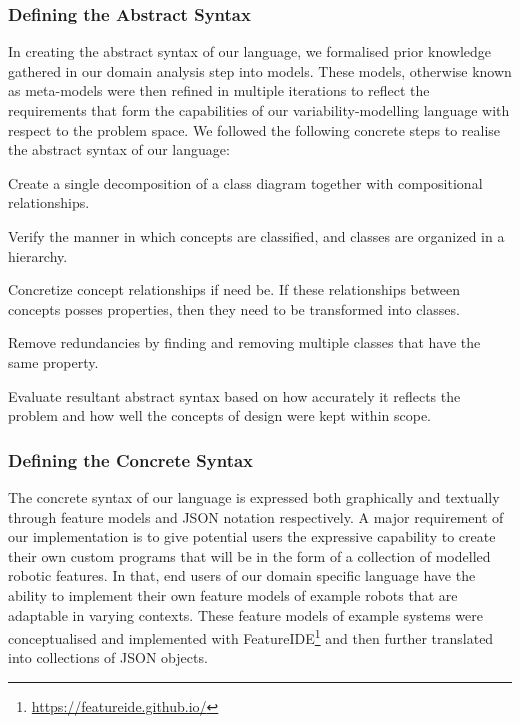 \documentclass[conference]{IEEEtran}
\newcommand{\foot}[1]{\footnote{\url{#1}}}
\begin{document}
\subsubsection{Defining the Abstract Syntax}
In creating the abstract syntax of our language, we formalised prior knowledge gathered in our domain analysis step into models. These models, otherwise known as meta-models were then refined in multiple iterations to reflect the requirements that form the capabilities of our variability-modelling language with respect to the problem space. We followed the following concrete steps to realise the abstract syntax of our language: \begin{enumerate*}[label=(\roman*)]
    \item Create a single decomposition of a class diagram together with compositional relationships.
    \item Verify the manner in which concepts are classified, and classes are organized in a hierarchy.
    \item Concretize concept relationships if need be. If these relationships between concepts posses properties, then they need to be transformed into classes.
    \item Remove redundancies by finding and removing multiple classes that have the same property.
    \item Evaluate resultant abstract syntax based on how accurately it reflects the problem and how well the concepts of design were kept within scope.
\end{enumerate*}

\subsubsection{Defining the Concrete Syntax}
The concrete syntax of our language is expressed both graphically and textually through feature models and JSON notation respectively. A major requirement of our implementation is to give potential users the expressive capability to create their own custom programs that will be in the form of a collection of modelled robotic features. In that, end users of our domain specific language have the ability to implement their own feature models of example robots that are adaptable in varying contexts. These feature models of example systems were conceptualised and implemented with FeatureIDE\foot{https://featureide.github.io/} and then further translated into collections of JSON objects.
\end{document}
